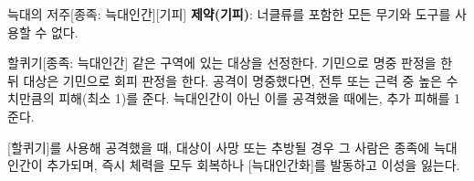\documentclass{report}
\begin{document}
	\begin{story}{늑대의 저주}{[종족: 늑대인간][기피]}
		\textbf{제약(기피)}: 너클류를 포함한 모든 무기와 도구를 사용할 수 없다.
		
		\smallskip
		
	\end{story}
	
	\begin{story}{할퀴기}{[종족: 늑대인간]}
		같은 구역에 있는 대상을 선정한다. 기민으로 명중 판정을 한 뒤 대상은 기민으로 회피 판정을 한다. 공격이 명중했다면, 전투 또는 근력 중 높은 수치만큼의 피해(최소 1)를 준다. 늑대인간이 아닌 이를 공격했을 때에는, 추가 피해를 1 준다.
		
		[할퀴기]를 사용해 공격했을 때, 대상이 사망 또는 추방될 경우 그 사람은 종족에 늑대인간이 추가되며, 즉시 체력을 모두 회복하나 [늑대인간화]를 발동하고 이성을 잃는다.
		
		\smallskip
		
	\end{story}
\end{document}
